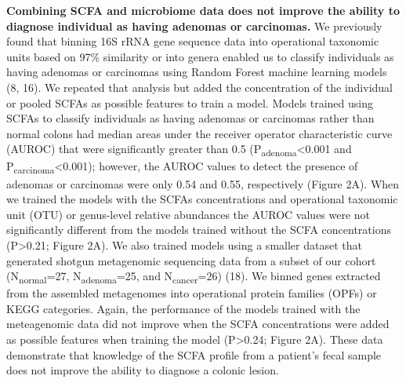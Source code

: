 \documentclass[11pt,]{article}
\begin{document}
\textbf{Combining SCFA and microbiome data does not improve the ability
to diagnose individual as having adenomas or carcinomas.} We previously
found that binning 16S rRNA gene sequence data into operational
taxonomic units based on 97\% similarity or into genera enabled us to
classify individuals as having adenomas or carcinomas using Random
Forest machine learning models (8, 16). We repeated that analysis but
added the concentration of the individual or pooled SCFAs as possible
features to train a model. Models trained using SCFAs to classify
individuals as having adenomas or carcinomas rather than normal colons
had median areas under the receiver operator characteristic curve
(AUROC) that were significantly greater than 0.5
(P\textsubscript{adenoma}\textless{}0.001 and
P\textsubscript{carcinoma}\textless{}0.001); however, the AUROC values
to detect the presence of adenomas or carcinomas were only 0.54 and
0.55, respectively (Figure 2A). When we trained the models with the
SCFAs concentrations and operational taxonomic unit (OTU) or genus-level
relative abundances the AUROC values were not significantly different
from the models trained without the SCFA concentrations
(P\textgreater{}0.21; Figure 2A). We also trained models using a smaller
dataset that generated shotgun metagenomic sequencing data from a subset
of our cohort (N\textsubscript{normal}=27, N\textsubscript{adenoma}=25,
and N\textsubscript{cancer}=26) (18). We binned genes extracted from the
assembled metagenomes into operational protein families (OPFs) or KEGG
categories. Again, the performance of the models trained with the
meteagenomic data did not improve when the SCFA concentrations were
added as possible features when training the model (P\textgreater{}0.24;
Figure 2A). These data demonstrate that knowledge of the SCFA profile
from a patient's fecal sample does not improve the ability to diagnose a
colonic lesion.
\end{document}
